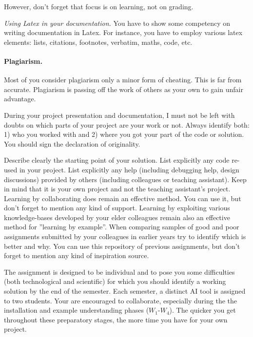 However, don't forget that focus is on learning, not on grading.

{\it Using Latex in your documentation.} You have to show some competency on writing documentation in Latex. 
For instance, you have to employ various latex elements: lists, citations, footnotes, verbatim, maths, code, etc. 


\paragraph{Plagiarism.} Most of you consider plagiarism only a minor form of cheating.
This is far from accurate. Plagiarism is passing off the work of others as your own to gain unfair advantage. 

During your project presentation and documentation, 
I must not be left with doubts on which parts of your project are your work or not.  
Always identify both: 
1) who you worked with and 
2) where you got your part of the code or solution.
You should sign the declaration of originality. 

Describe clearly the starting point of your solution.
List explicitly any code re-used in your project. 
List explicitly any help (including debugging help, design discussions) provided by others (including colleagues or teaching assistant). 
Keep in mind that it is your own project and not the teaching assistant's project. 
Learning by collaborating does remain an effective method. 
You can use it, but don't forget to mention any kind of support. 
Learning by exploiting various knowledge-bases developed by your elder colleagues remain also an effective method for ''learning by example''. 
When comparing samples of good and poor assignments submitted by your colleagues in earlier years try to identify which is better and why. 
You can use this repository of previous assignments, but don't forget to mention any kind of inspiration source. 

The assignment is designed to be individual and to pose you some difficulties 
(both technological and scientific) for which you should identify a working solution by the end of the semester.  
Each semester, a distinct AI tool is assigned to two students. 
Your are encouraged to collaborate, especially during the the installation and example understanding phases ($W_1$-$W_4$). The quicker you get throughout these preparatory stages, the more time you have for your own project.


